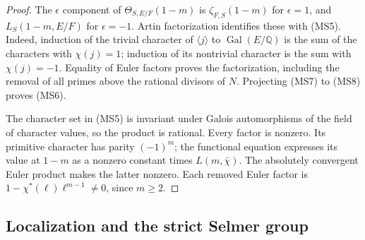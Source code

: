 \begin{proof}
The $\epsilon$ component of $\Theta_{S,E/F}(1-m)$ is
$\zeta_{F,S}(1-m)$ for $\epsilon=1$, and
$L_S(1-m,E/F)$ for $\epsilon=-1$.
Artin factorization identifies these with (MS5).
Indeed, induction of the trivial character of
$\langle j\rangle$ to $\operatorname{Gal}(E/\mathbb Q)$
is the sum of the characters with $\chi(j)=1$;
induction of its nontrivial character is the sum with
$\chi(j)=-1$.  Equality of Euler factors proves the
factorization, including the removal of all primes above
the rational divisors of $N$.
Projecting (MS7) to (MS8) proves (MS6).

The character set in (MS5) is invariant under Galois
automorphisms of the field of character values, so the
product is rational.  Every factor is nonzero.
Its primitive character has parity $(-1)^m$; the
functional equation expresses its value at $1-m$ as a
nonzero constant times $L(m,\bar\chi)$.
The absolutely convergent Euler product makes the latter
nonzero.  Each removed Euler factor is
$1-\chi^*(\ell)\ell^{m-1}\ne0$, since $m\ge2$.
\end{proof}

\subsection{Localization and the strict Selmer group}

